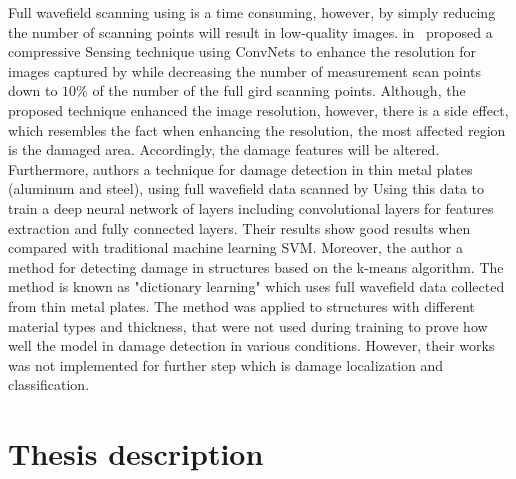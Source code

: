 Full wavefield scanning using   is a time consuming, however, by simply reducing the number of scanning points will result in low-quality images. 
 in~\cite{esfandabadideep} proposed a compressive Sensing technique using ConvNets to enhance the resolution for images captured by   while decreasing the number of measurement scan points down to \(10\%\) of the number of the full gird scanning points. 
Although, the proposed technique enhanced the image resolution, however, there is a side effect, which resembles the fact when enhancing the resolution, the most affected region is the damaged area. Accordingly, the damage features will be altered.
Furthermore, authors   a technique for damage detection in thin metal plates (aluminum and steel), using full wavefield data scanned by   Using this data to train a deep neural network of   layers including   convolutional layers for features extraction and   fully connected layers. Their results show good results when compared with traditional machine learning SVM.
Moreover, the author   a method for detecting damage in structures based on the k-means algorithm. The method is known as "dictionary learning" which uses full wavefield data collected from thin metal plates. 
The method was applied to structures with different material types and thickness, that were not used during training to prove how well the model in damage detection in various conditions. 
However, their works was not implemented for further step which is damage localization and classification.



\section{}

\section{Thesis description}


